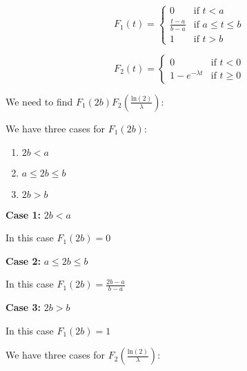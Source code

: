 \begin{equation}
    F_1(t) = \begin{cases}
        0                 & \text{if } t < a           \\
        \frac{t - a}{b-a} & \text{if } a \leq t \leq b \\
        1                 & \text{if } t > b
    \end{cases}
\end{equation}

\singlespacing

\begin{equation}
    F_2(t) = \begin{cases}
        0                  & \text{if } t < 0    \\
        1 - e^{-\lambda t} & \text{if } t \geq 0
    \end{cases}
\end{equation}

\singlespacing

We need to find $F_1(2b)F_2(\frac{\text{ln}(2)}{\lambda})$:

\singlespacing
\singlespacing

We have three cases for $F_1(2b)$:

\singlespacing

\begin{enumerate}
    \item $2b < a$
    \item $a \leq 2b \leq b$
    \item $2b > b$
\end{enumerate}

\singlespacing

\textbf{Case 1:} $2b < a$

\singlespacing

In this case $F_1(2b) = 0$

\singlespacing

\textbf{Case 2:} $a \leq 2b \leq b$

\singlespacing

In this case $F_1(2b) = \frac{2b - a}{b-a}$

\singlespacing

\textbf{Case 3:} $2b > b$

\singlespacing

In this case $F_1(2b) = 1$

\singlespacing
\singlespacing

We have three cases for $F_2(\frac{\text{ln}(2)}{\lambda})$:

